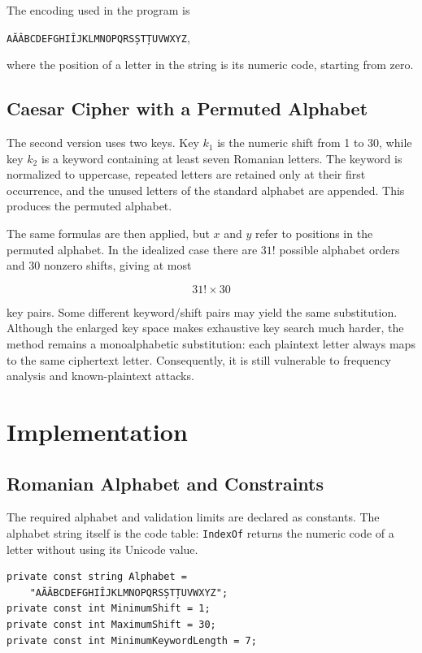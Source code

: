 \documentclass[12pt,a4paper]{article}
\begin{document}
The encoding used in the program is

\begin{center}
\small
\texttt{AĂÂBCDEFGHIÎJKLMNOPQRSȘTȚUVWXYZ},
\end{center}

where the position of a letter in the string is its numeric code, starting from zero.

\subsection{Caesar Cipher with a Permuted Alphabet}

The second version uses two keys. Key $k_1$ is the numeric shift from 1 to 30, while key $k_2$ is a keyword containing at least seven Romanian letters. The keyword is normalized to uppercase, repeated letters are retained only at their first occurrence, and the unused letters of the standard alphabet are appended. This produces the permuted alphabet.

The same formulas are then applied, but $x$ and $y$ refer to positions in the permuted alphabet. In the idealized case there are $31!$ possible alphabet orders and 30 nonzero shifts, giving at most

\begin{equation}
  31!\times 30
\end{equation}

key pairs. Some different keyword/shift pairs may yield the same substitution. Although the enlarged key space makes exhaustive key search much harder, the method remains a monoalphabetic substitution: each plaintext letter always maps to the same ciphertext letter. Consequently, it is still vulnerable to frequency analysis and known-plaintext attacks.

\newpage
\section{Implementation}

\subsection{Romanian Alphabet and Constraints}

The required alphabet and validation limits are declared as constants. The alphabet string itself is the code table: \texttt{IndexOf} returns the numeric code of a letter without using its Unicode value.

\begin{lstlisting}[style=csharp,caption={Alphabet encoding and key constraints}]
private const string Alphabet =
    "AĂÂBCDEFGHIÎJKLMNOPQRSȘTȚUVWXYZ";
private const int MinimumShift = 1;
private const int MaximumShift = 30;
private const int MinimumKeywordLength = 7;
\end{lstlisting}
\end{document}
